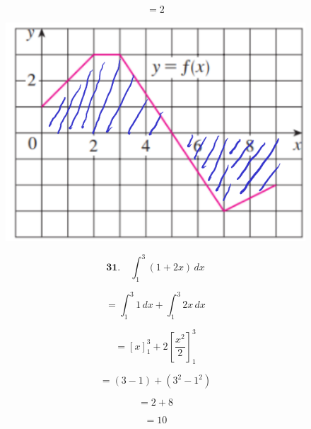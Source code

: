 \[
= 2
\]

\begin{figure}[H]
    \centering
    \includegraphics[scale=0.3]{images/integral5.png}
\end{figure}

\[
\textbf{31.} \quad \int_{1}^{3} (1 + 2x) \,dx
\]

\[
= \int_{1}^{3} 1 \,dx + \int_{1}^{3} 2x \,dx
\]

\[
= \left[ x \right]_{1}^{3} + 2 \left[ \frac{x^2}{2} \right]_{1}^{3}
\]

\[
= (3 - 1) + \left( 3^2 - 1^2 \right)
\]

\[
= 2 + 8
\]

\[
= 10
\]
